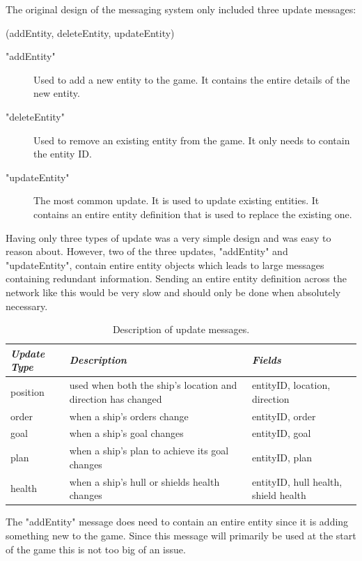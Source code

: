 The original design of the messaging system only included three update messages:

\functions(addEntity, deleteEntity, updateEntity)
\begin{description}
	\item["addEntity"] Used to add a new entity to the game. It contains the entire details of the new entity.
	\item["deleteEntity"] Used to remove an existing entity from the game. It only needs to contain the entity ID.
	\item["updateEntity"] The most common update. It is used to update existing entities. It contains an entire entity definition that is used to replace the existing one.
\end{description}

Having only three types of update was a very simple design and was easy to reason about. However, two of the three updates, "addEntity" and "updateEntity", contain entire entity objects which leads to large messages containing redundant information. Sending an entire entity definition across the network like this would be very slow and should only be done when absolutely necessary.

\begin{table}[t]
    \begin{tabular}{p{5em} p{15em} p{6em}}
    \toprule
    \emph{Update Type} & \emph{Description} & \emph{Fields} \\
    \midrule
    position & used when both the ship's location and direction has changed & entityID, location, direction \\
    order & when a ship's orders change & entityID, order \\
    goal & when a ship's goal changes & entityID, goal \\
    plan & when a ship's plan to achieve its goal changes & entityID, plan \\
    health & when a ship's hull or shields health changes & entityID, hull health, shield health \\ 
    \bottomrule
    \end{tabular}
    	\vspace{1em}
	\caption[Description of update messages]{Description of update messages.}
	\label{tab:updateMessageTypes}
\end{table}

The "addEntity" message does need to contain an entire entity since it is adding something new to the game. Since this message will primarily be used at the start of the game this is not too big of an issue.

